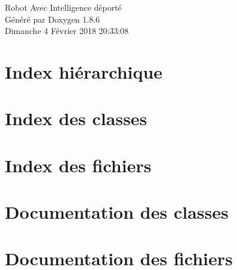 \documentclass[twoside]{book}
\newcommand{\clearemptydoublepage}{%
  \newpage{\pagestyle{empty}\cleardoublepage}%
}
\begin{document}
\hypersetup{pageanchor=false}
\begin{titlepage}
\vspace*{7cm}
\begin{center}%
{\Large Robot Avec Intelligence déporté }\\
\vspace*{1cm}
{\large Généré par Doxygen 1.8.6}\\
\vspace*{0.5cm}
{\small Dimanche 4 Février 2018 20:33:08}\\
\end{center}
\end{titlepage}
\clearemptydoublepage
\tableofcontents
\clearemptydoublepage
{}
\hypersetup{pageanchor=true}

\chapter{Index hiérarchique}

\chapter{Index des classes}

\chapter{Index des fichiers}

\chapter{Documentation des classes}














\chapter{Documentation des fichiers}




























\newpage
{}
{}
\printindex
\end{document}
